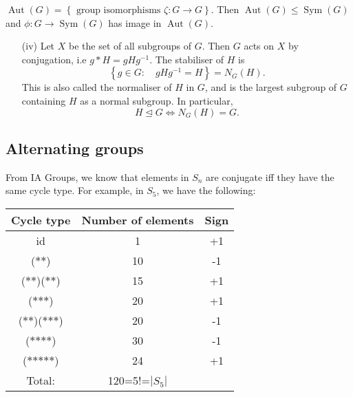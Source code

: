 \documentclass[egregdoesnotlikesansseriftitles,a4paper]{scrartcl}
\begin{document}
\begin{definition*}[Automorphism]
      $\operatorname{Aut}(G)=\left\{\text{ group isomorphisms } \zeta: G \rightarrow G\right\}$. Then $\operatorname{Aut}(G)\leq \operatorname{Sym}(G)$ and $\phi: G \rightarrow \operatorname{Sym}(G)$ has image in $\operatorname{Aut}(G).$ 
\end{definition*}
\begin{itemize}
     \item[(iv)] Let $X$ be the set of all subgroups of $G$. Then $G$ acts on $X$ by conjugation, i.e $g \ast H=gH {g}^{-1}$. The stabiliser of $H$ is \[
     \left\{g \in G: \quad g H {g}^{-1}=H\right\}=N_{G}(H)
     .\] This is also called the normaliser of $H$ in $G$, and is the largest subgroup of $G$ containing $H$ as a normal subgroup. In particular, \[
     H \unlhd G \iff N_{G}(H) =G
     .\] 
\end{itemize}
\subsection{Alternating groups}
From IA Groups, we know that elements in $S_{n}$ are conjugate iff they have the same cycle type. For example, in $S_5$, we have the following:
\begin{center}
\begin{tabular}{|c|c|c|}
     \hline
     Cycle type & Number of elements & Sign\\
     \hline
     id &1&+1\\
     ($\ast$$\ast$)&10&-1\\
     ($\ast$$\ast$)($\ast$$\ast$)&15&+1\\
     ($\ast$$\ast$$\ast$)& 20&+1\\
     ($\ast$$\ast$)($\ast$$\ast$$\ast$) & 20&-1\\
     ($\ast$$\ast$$\ast$$\ast$) & 30&-1\\
     ($\ast$$\ast$$\ast$$\ast$$\ast$) & 24&+1\\
     \hline
     Total:& 120=5!=$|S_5 |$&\\
     \hline
\end{tabular}
\end{center}
\end{document}
